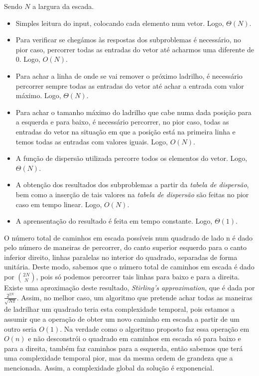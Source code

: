 \documentclass[12pt,a4paper]{article}
\begin{document}
  Sendo $N$ a largura da escada.

  \begin{itemize}
    \setlength{\itemsep}{0pt}
    \item Simples leitura do input, colocando cada elemento num vetor. Logo, $\Theta(N)$.
    \item Para verificar se chegámos às respostas dos subproblemas é necessário, no pior caso, percorrer todas as entradas do vetor até acharmos uma diferente de 0. Logo, $O(N)$.
    \item Para achar a linha de onde se vai remover o próximo ladrilho, é necessário percorrer sempre todas as entradas do vetor até achar a entrada com valor máximo. Logo, $\Theta(N)$.
    \item Para achar o tamanho máximo do ladrilho que cabe numa dada posição para a esquerda e para baixo, é necessário percorrer, no pior caso, todas as entradas do vetor na situação em que a posição está na primeira linha e temos todas as entradas com valores iguais. Logo, $O(N)$.
    \item A função de dispersão utilizada percorre todos os elementos do vetor. Logo, $\Theta(N)$.
    \item A obtenção dos resultados dos subproblemas a partir da \textit{tabela de dispersão}, bem como a inserção de tais valores na \textit{tabela de dispersão} são feitas no pior caso em tempo linear. Logo, $O(N)$.
    \item A aprensentação do resultado é feita em tempo constante. Logo, $\Theta(1)$.
  \end{itemize}

  O número total de caminhos em escada possíveis num quadrado de lado n é dado pelo número de maneiras de percorrer, do canto superior esquerdo para o canto inferior direito, linhas paralelas no interior do quadrado, separadas de forma unitária.
  Deste modo, sabemos que o número total de caminhos em escada é dado por $2N \choose N$, pois só podemos percorrer tais linhas para baixo e para a direita.
  Existe uma aproximação deste resultado, \textit{Stirling's approximation}\cite{enwiki:1126871905}, que é dada por $\frac{2^{2N}}{\sqrt{N\pi}}$.
  Assim, no melhor caso, um algoritmo que pretende achar todas as maneiras de ladrilhar um quadrado teria esta complexidade temporal, pois estamos a assumir que a operação de obter um novo caminho em escada a partir de um outro seria $O(1)$.
  Na verdade como o algoritmo proposto faz essa operação em $O(n)$ e não desconstrói o quadrado em caminhos em escada só para baixo e para a direita, também faz caminhos para a esquerda, então sabemos que terá uma complexidade temporal pior, mas da mesma ordem de grandeza que a mencionada.
  Assim, a complexidade global da solução é exponencial.
\end{document}
